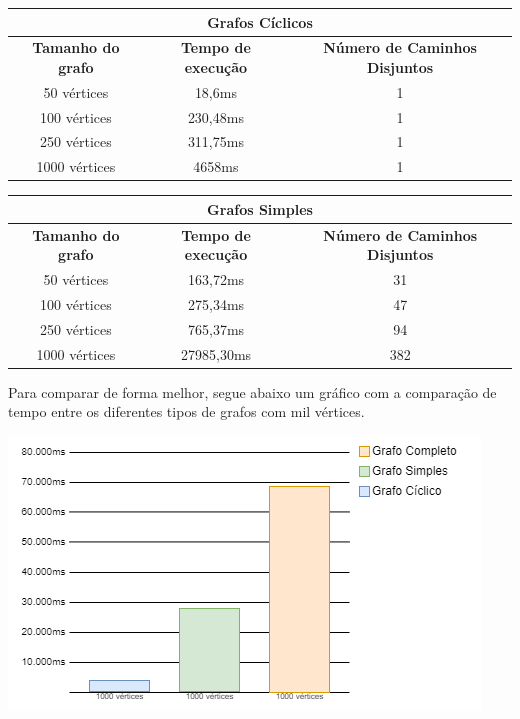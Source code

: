 \vspace{1pt}

\begin{center}
\begin{tabular}{ |c|c|c| }
 \hline
 \multicolumn{3}{|c|}{\textbf{Grafos Cíclicos}} \\
 \hline
 \textbf{Tamanho do grafo} & \textbf{Tempo de execução} & \textbf{Número de Caminhos Disjuntos} \\ 
 \hline
 50 vértices & 18,6ms & 1 \\  
 \hline
 100 vértices & 230,48ms & 1 \\
 \hline  
 250 vértices & 311,75ms & 1 \\
 \hline  
 1000 vértices & 4658ms & 1 \\
 \hline  
\end{tabular}
\end{center}

\vspace{1pt}

\begin{center}
\begin{tabular}{ |c|c|c| }
 \hline
 \multicolumn{3}{|c|}{\textbf{Grafos Simples}} \\
 \hline
 \textbf{Tamanho do grafo} & \textbf{Tempo de execução} & \textbf{Número de Caminhos Disjuntos} \\ 
 \hline
 50 vértices & 163,72ms & 31 \\  
 \hline
 100 vértices & 275,34ms & 47 \\
 \hline  
 250 vértices & 765,37ms & 94 \\
 \hline  
 1000 vértices & 27985,30ms & 382 \\
 \hline  
\end{tabular}
\end{center}

Para comparar de forma melhor, segue abaixo um gráfico com a comparação de tempo entre os diferentes tipos de grafos com mil vértices.

\begin{center}
    \includegraphics[scale=0.75]{figuras/grafico.png}
\end{center}




